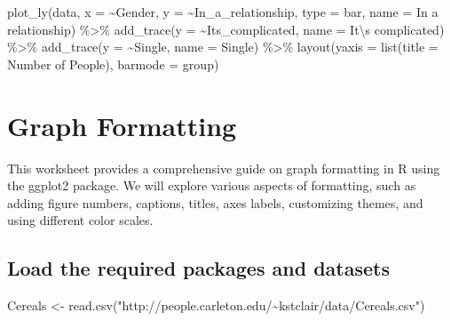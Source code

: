 \documentclass[
]{book}
\newenvironment{Shaded}{\begin{snugshade}}{\end{snugshade}}
\newcommand{\AttributeTok}[1]{\textcolor[rgb]{0.77,0.63,0.00}{#1}}
\newcommand{\FunctionTok}[1]{\textcolor[rgb]{0.00,0.00,0.00}{#1}}
\newcommand{\NormalTok}[1]{#1}
\newcommand{\OtherTok}[1]{\textcolor[rgb]{0.56,0.35,0.01}{#1}}
\newcommand{\SpecialCharTok}[1]{\textcolor[rgb]{0.00,0.00,0.00}{#1}}
\newcommand{\StringTok}[1]{\textcolor[rgb]{0.31,0.60,0.02}{#1}}
\begin{document}
\begin{Shaded}
\begin{Highlighting}[]
\FunctionTok{plot\_ly}\NormalTok{(data, }\AttributeTok{x =} \SpecialCharTok{\textasciitilde{}}\NormalTok{Gender, }\AttributeTok{y =} \SpecialCharTok{\textasciitilde{}}\NormalTok{In\_a\_relationship, }\AttributeTok{type =} \StringTok{\textquotesingle{}bar\textquotesingle{}}\NormalTok{, }\AttributeTok{name =} \StringTok{\textquotesingle{}In a relationship\textquotesingle{}}\NormalTok{) }\SpecialCharTok{\%\textgreater{}\%}
  \FunctionTok{add\_trace}\NormalTok{(}\AttributeTok{y =} \SpecialCharTok{\textasciitilde{}}\NormalTok{Its\_complicated, }\AttributeTok{name =} \StringTok{\textquotesingle{}It}\SpecialCharTok{\textbackslash{}\textquotesingle{}}\StringTok{s complicated\textquotesingle{}}\NormalTok{) }\SpecialCharTok{\%\textgreater{}\%}
  \FunctionTok{add\_trace}\NormalTok{(}\AttributeTok{y =} \SpecialCharTok{\textasciitilde{}}\NormalTok{Single, }\AttributeTok{name =} \StringTok{\textquotesingle{}Single\textquotesingle{}}\NormalTok{) }\SpecialCharTok{\%\textgreater{}\%}
  \FunctionTok{layout}\NormalTok{(}\AttributeTok{yaxis =} \FunctionTok{list}\NormalTok{(}\AttributeTok{title =} \StringTok{\textquotesingle{}Number of People\textquotesingle{}}\NormalTok{), }\AttributeTok{barmode =} \StringTok{\textquotesingle{}group\textquotesingle{}}\NormalTok{)}
\end{Highlighting}
\end{Shaded}

\hypertarget{graph-formatting}{%
\chapter{Graph Formatting}\label{graph-formatting}}

This worksheet provides a comprehensive guide on graph formatting in R using the ggplot2 package. We will explore various aspects of formatting, such as adding figure numbers, captions, titles, axes labels, customizing themes, and using different color scales.

\hypertarget{load-the-required-packages-and-datasets}{%
\section{Load the required packages and datasets}\label{load-the-required-packages-and-datasets}}

\begin{Shaded}
\begin{Highlighting}[]
\NormalTok{Cereals }\OtherTok{\textless{}{-}} \FunctionTok{read.csv}\NormalTok{(}\StringTok{"http://people.carleton.edu/\textasciitilde{}kstclair/data/Cereals.csv"}\NormalTok{)}
\end{Highlighting}
\end{Shaded}
\end{document}
